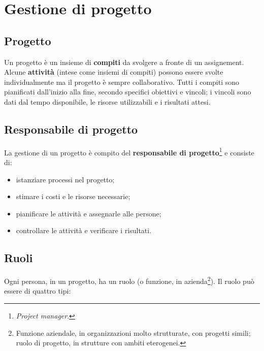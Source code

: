 \documentclass[a4paper]{article}
\begin{document}
		
	\section{Gestione di progetto}


		
	\subsection{Progetto}

		
Un progetto è un insieme di \textbf{compiti} da svolgere a fronte di un assignement. Alcune \textbf{attività} (intese come insiemi di compiti) possono essere svolte individualmente ma il progetto è sempre collaborativo. Tutti i compiti sono pianificati dall'inizio alla fine, secondo specifici obiettivi e vincoli; i vincoli sono dati dal tempo disponibile, le risorse utilizzabili e i risultati attesi.

		
	\subsection{Responsabile di progetto}

		
La gestione di un progetto è compito del \textbf{responsabile di progetto}\footnote{\emph{Project manager}.} e consiste di:
		
	\begin{itemize}
		
			
	\item istanziare processi nel progetto;
			
	\item stimare i costi e le risorse necessarie;
			
	\item pianificare le attività e assegnarle alle persone;
			
	\item controllare le attività e verificare i risultati.
		
	\end{itemize}


		
	\subsection{Ruoli}

		
Ogni persona, in un progetto, ha un ruolo (o funzione, in azienda\footnote{Funzione aziendale, in organizzazioni molto strutturate, con progetti simili; ruolo di progetto, in strutture con ambiti eterogenei.}). Il ruolo può essere di quattro tipi:
		
\end{document}
